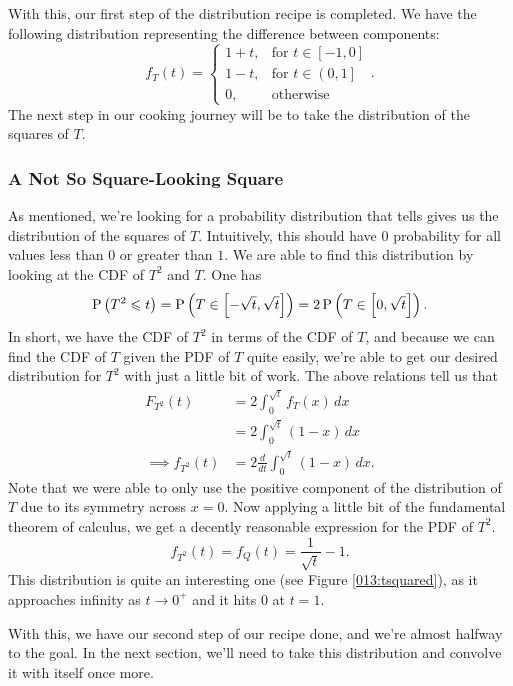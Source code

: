 With this, our first step of the distribution recipe is completed. We have the following distribution representing the difference between components:
\[
    f_T \left( t \right) = \begin{cases}
        1 + t, & \text{for } t \in \left[ -1, 0 \right] \\
        1 - t, & \text{for } t \in \left( 0, 1 \right] \\
        0, & \text{otherwise}
    \end{cases}
.\]
The next step in our cooking journey will be to take the distribution of the
squares of \( T \).

\subsubsection{A Not So Square-Looking Square}

As mentioned, we're looking for a probability distribution that tells gives us the distribution of the squares of \( T \). Intuitively, this should have \( 0 \) probability for all values less than \( 0 \) or greater than \( 1 \). We are able to find this distribution by looking at the CDF of \( T^2 \) and \( T \). One has
\[
    \operatorname{P} \left( T^2 \leqslant t \right) = \operatorname{P} \left( T \in \left[ -\sqrt{t}, \sqrt{t} \right] \right) = 2 \operatorname{P} \left( T \in \left[ 0, \sqrt{t} \right] \right)
.\]
In short, we have the CDF of \( T^2 \) in terms of the CDF of \( T \), and
because we can find the CDF of \( T \) given the PDF of \( T \) quite easily,
we're able to get our desired distribution for \( T^2 \) with just a little bit
of work. The above relations tell us that
\begin{align*}
    F_{T^2} \left( t \right) &= 2\int_{0}^{\sqrt{t}} f_T \left( x \right) \, dx \\
    &= 2\int_{0}^{\sqrt{t}} \left( 1 - x \right) \, dx \\
    \implies f_{T^2} \left( t \right) &= 2 \frac{d}{dt} \int_{0}^{\sqrt{t}} \left( 1 - x \right) \, dx
.\end{align*}
Note that we were able to only use the positive component of the distribution
of \( T \) due to its symmetry across \( x = 0 \). Now applying a little bit of the fundamental theorem of calculus, we get a decently reasonable expression for the PDF of \( T^2 \).
\[
    f_{T^2} \left( t \right) = f_{Q} \left( t \right) = \frac{1}{\sqrt{t}} - 1
.\]
This distribution is quite an interesting one (see Figure \ref{013:tsquared}),
as it approaches infinity as \( t \to 0^+ \) and it hits \( 0 \) at \( t = 1
\).

With this, we have our second step of our recipe done, and we're almost halfway
to the goal. In the next section, we'll need to take this distribution and
convolve it with itself once more.

